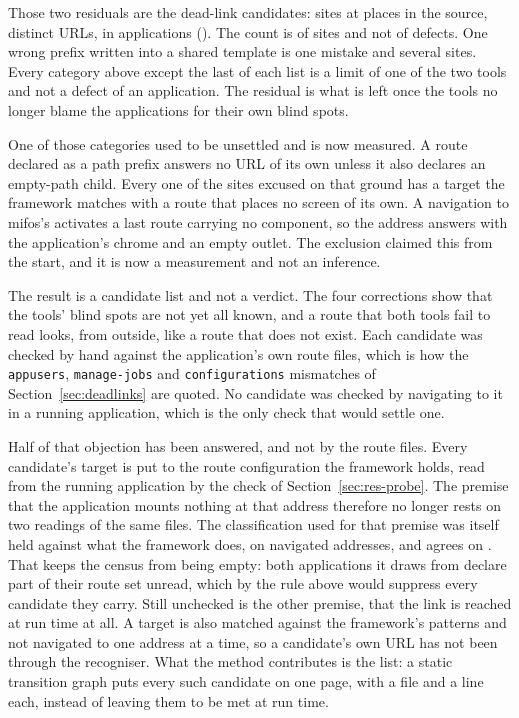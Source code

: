 Those two residuals are the dead-link candidates: \RoundTwoDeadLinkCandidates{} sites at \RoundTwoDeadLinkLocations{} places in the source, \RoundTwoDeadLinkUrls{} distinct URLs, in \RoundTwoDeadLinkApps{} applications (\RoundTwoDeadLinkWhere{}). The count is of sites and not of defects. One wrong prefix written into a shared template is one mistake and several sites. Every category above except the last of each list is a limit of one of the two tools and not a defect of an application. The residual is what is left once the tools no longer blame the applications for their own blind spots.

One of those categories used to be unsettled and is now measured. A route declared as a path prefix answers no URL of its own unless it also declares an empty-path child. Every one of the \RoundTwoFrameworkPrefix{} sites excused on that ground has a target the framework matches with a route that places no screen of its own. A navigation to mifos's  activates a last route carrying no component, so the address answers with the application's chrome and an empty outlet. The exclusion claimed this from the start, and it is now a measurement and not an inference.

The result is a candidate list and not a verdict. The four corrections show that the tools' blind spots are not yet all known, and a route that both tools fail to read looks, from outside, like a route that does not exist. Each candidate was checked by hand against the application's own route files, which is how the \texttt{appusers}, \texttt{manage-jobs} and \texttt{configurations} mismatches of Section~\ref{sec:deadlinks} are quoted. No candidate was checked by navigating to it in a running application, which is the only check that would settle one.

Half of that objection has been answered, and not by the route files. Every candidate's target is put to the route configuration the framework holds, read from the running application by the check of Section~\ref{sec:res-probe}. The premise that the application mounts nothing at that address therefore no longer rests on two readings of the same files. The classification used for that premise was itself held against what the framework does, on \ProbeAnswerChecked{} navigated addresses, and agrees on \ProbeAnswerAgreed{}. That keeps the census from being empty: both applications it draws from declare part of their route set unread, which by the rule above would suppress every candidate they carry. Still unchecked is the other premise, that the link is reached at run time at all. A target is also matched against the framework's patterns and not navigated to one address at a time, so a candidate's own URL has not been through the recogniser. What the method contributes is the list: a static transition graph puts every such candidate on one page, with a file and a line each, instead of leaving them to be met at run time.

